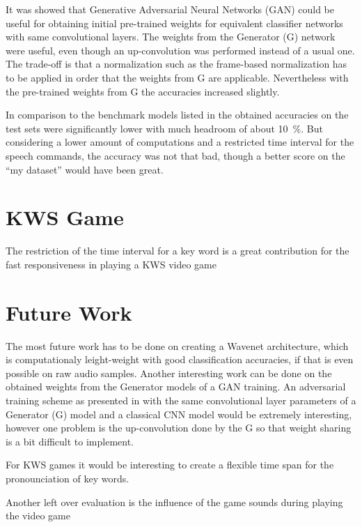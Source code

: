 It was showed that Generative Adversarial Neural Networks (GAN) could be useful for obtaining initial pre-trained weights for equivalent classifier networks with same convolutional layers.
The weights from the Generator (G) network were useful, even though an up-convolution was performed instead of a usual one.
The trade-off is that a normalization such as the frame-based normalization has to be applied in order that the weights from G are applicable.
Nevertheless with the pre-trained weights from G the accuracies increased slightly.

In comparison to the benchmark models listed in  the obtained accuracies on the test sets were significantly lower with much headroom of about \SI{10}{\percent}.
But considering a lower amount of computations and a restricted time interval for the speech commands, the accuracy was not that bad, though a better score on the \enquote{my dataset} would have been great.



\section{KWS Game}
\thesisStateNotReady
The restriction of the time interval for a key word is a great contribution for the fast responsiveness in playing a KWS video game



\section{Future Work}
\thesisStateNotReady
The most future work has to be done on creating a Wavenet architecture, which is computationaly leight-weight with good classification accuracies, if that is even possible on raw audio samples.
Another interesting work can be done on the obtained weights from the Generator models of a GAN training. 
An adversarial training scheme as presented in \cite{Oezdenizci2020} with the same convolutional layer parameters of a Generator (G) model and a classical CNN model would be extremely interesting, however one problem is the up-convolution done by the G so that weight sharing is a bit difficult to implement.

For KWS games it would be interesting to create a flexible time span for the pronounciation of key words.

Another left over evaluation is the influence of the game sounds during playing the video game